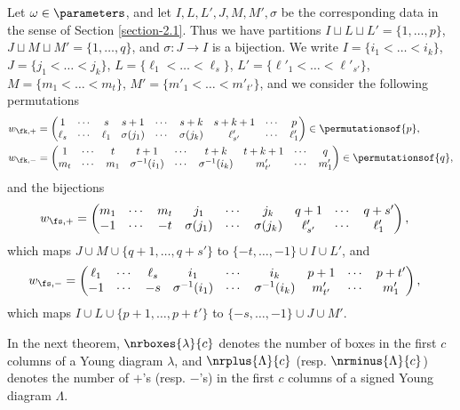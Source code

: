 Let $\omega\in\parameters$, and let $I,L,L',J,M,M',\sigma$ be the corresponding data in the sense of Section \ref{section-2.1}. Thus we have partitions $I\sqcup L\sqcup L'=\{1,\ldots,p\}$, $J\sqcup M\sqcup M'=\{1,\ldots,q\}$, and $\sigma:J\to I$ is a bijection.
We write $I=\{i_1<\ldots<i_k\}$, $J=\{j_1<\ldots<j_k\}$,
$L=\{\ell_1<\ldots<\ell_s\}$, $L'=\{\ell'_1<\ldots<\ell'_{s'}\}$, $M=\{m_1<\ldots<m_t\}$, $M'=\{m'_1<\ldots<m'_{t'}\}$,
and we consider the following permutations
\begin{eqnarray}
\label{wk+} & w_{\fk,+}=\begin{pmatrix} 1 & \cdots & s & s+1 & \cdots & s+k & s+k+1 & \cdots & p\\
\ell_s & \cdots & \ell_1 & \sigma(j_1) & \cdots & \sigma(j_k) & \ell'_{s'} & \cdots & \ell'_1\end{pmatrix}\in\permutationsof{p},\\
\label{wk-} & w_{\fk,-}=\begin{pmatrix} 1 & \cdots & t & t+1 & \cdots & t+k & t+k+1 & \cdots & q\\
m_t & \cdots & m_1 & \sigma^{-1}(i_1) & \cdots & \sigma^{-1}(i_k) & m'_{t'} & \cdots & m'_1\end{pmatrix}\in\permutationsof{q},
\end{eqnarray}
and the bijections
\begin{eqnarray}
\label{ws+} & w_{\fs,+} = \begin{pmatrix} m_1 & \cdots & m_t & j_1 & \cdots & j_k & q+1 & \cdots & q+s'\\
-1 & \cdots & -t & \sigma(j_1) & \cdots & \sigma(j_k) & \ell'_{s'} & \cdots & \ell'_1 \end{pmatrix},
\end{eqnarray}
which maps $J\cup M\cup\{q+1,\ldots,q+s'\}$ to $\{-t,\ldots,-1\}\cup I\cup L'$, and
\begin{eqnarray}
\label{ws-} & w_{\fs,-} = \begin{pmatrix} \ell_1 & \cdots & \ell_s & i_1 & \cdots & i_k & p+1 & \cdots & p+t'\\
-1 & \cdots & -s & \sigma^{-1}(i_1) & \cdots & \sigma^{-1}(i_k) & m'_{t'} & \cdots & m'_1 \end{pmatrix},
\end{eqnarray}
which maps $I\cup L\cup\{p+1,\ldots,p+t'\}$ to $\{-s,\ldots,-1\}\cup J\cup M'$.

In the next theorem,
 $\nrboxes{\lambda}{c}$ denotes the number of boxes in the first $c$ columns of a Young diagram $\lambda$, and $\nrplus{\Lambda}{c}$ (resp. $\nrminus{\Lambda}{c}$) denotes the number of $+$'s (resp. $-$'s) in the first $c$ columns of a signed Young diagram $\Lambda$.

